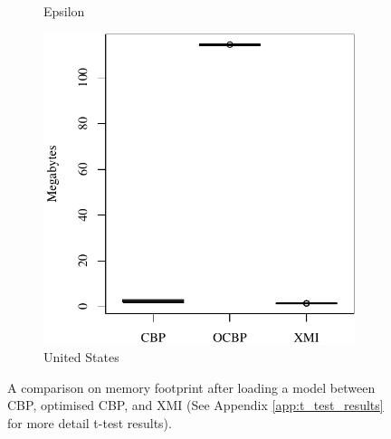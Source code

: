 \documentclass{llncs}
\begin{document}
\begin{figure}[t]
\begin{subfigure}{0.325\textwidth}
        \caption{Epsilon}
        \label{fig:load_memory_epsilon}
    \end{subfigure}
    \hfill
    \begin{subfigure}{0.325\textwidth}
        \centering
        \includegraphics[width=\linewidth]{images/load_memory_wikipedia}
        \caption{United States}
        \label{fig:load_memory_wikipedia}
    \end{subfigure}
    \caption{A comparison on memory footprint after loading a model between CBP, optimised CBP, and XMI (See Appendix \ref{app:t_test_results} for more detail t-test results).}
    \label{fig:loadmemory}
\end{figure}
\end{document}
